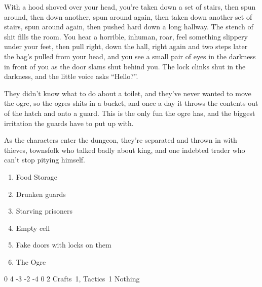 \begin{multicols}{2}

\begin{boxtext}

  With a hood shoved over your head, you're taken down a set of stairs, then spun around, then down another, spun around again, then taken down another set of stairs, spun around again, then pushed hard down a long hallway.
   The stench of shit fills the room.
   You hear a horrible, inhuman, roar, feel something slippery under your feet, then pull right, down the hall, right again and two steps later the bag's pulled from your head, and you see a small pair of eyes in the darkness in front of you as the door slams shut behind you.
   The lock clinks shut in the darkness, and the little voice asks ``Hello?''.

\end{boxtext}

They didn't know what to do about a toilet, and they've never wanted to move the ogre, so the ogres shits in a bucket, and once a day it throws the contents out of the hatch and onto a guard.
This is the only fun the ogre has, and the biggest irritation the guards have to put up with.

As the characters enter the dungeon, they're separated and thrown in with thieves, townsfolk who talked badly about \gls{king}, and one indebted trader who can't stop pitying himself.

\begin{enumerate}

  \item{Food Storage}
  \item{Drunken guards}
  \item{Starving prisoners}
  \item{Empty cell}
  \item{Fake doors with locks on them}
  \item{The Ogre}

\end{enumerate}


  {0}%
  {4}%
  {{-3}%
  {-2}%
  {-4}}%
  {0}%
  {2}%
  {Crafts~1, Tactics~1}%
  {Nothing}%
  {}


\subsection{}
\setcounter{list}{0}


\end{multicols}
